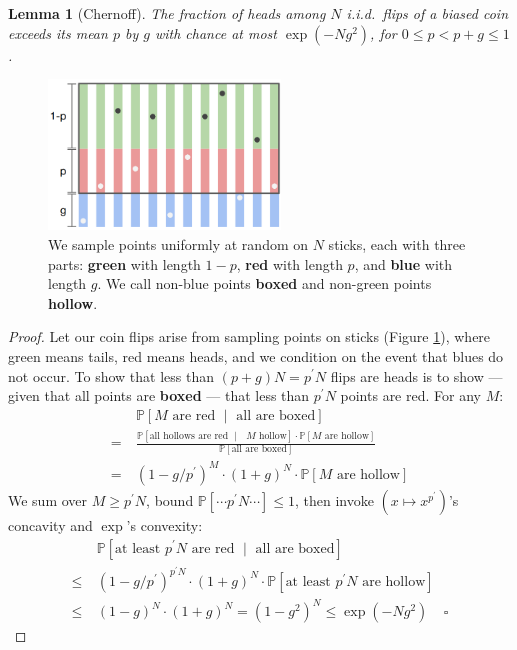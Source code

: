 \documentclass[11pt, justified]{tufte-book}
\newcommand{\Pp}{\mathbb{P}}\newcommand{\pP}{\mathcal{P}}
\newtheorem*{lem}{Lemma}
\theoremstyle{definition}
\begin{document}
        \begin{lem}[Chernoff]
            The fraction of heads among $N$ i.i.d.\ flips of a biased coin
            exceeds its mean $p$ by $g$ with chance at most 
            $\exp(-Ng^2)$, for $0 \leq p < p+g \leq 1$.
        \end{lem}
        \begin{figure}[h]
            \centering
            \includegraphics[height=4cm, clip]{chernoff}
            \caption{{
                We sample points uniformly at random on $N$
                sticks, each with three parts: \textbf{green}
                with length $1-p$, \textbf{red} with length $p$, and
                \textbf{blue} with length $g$.  We call non-blue points
                \textbf{boxed} and non-green points \textbf{hollow}.
            }}
            \label{fig:chernoff}
        \end{figure}
        \begin{proof} \renewcommand{\qedsymbol}{}
            Let our coin flips arise from sampling points on sticks
            (Figure \ref{fig:chernoff}), where green means tails, red
            means heads, and we condition on the event that blues do not occur.
            To show that less than $(p+g)N = p^\prime N$ flips are
            heads is to show --- given that all points are \textbf{boxed} ---
            that less than $p^\prime N$ points are red. 
            For any $M$:
            {%
            \begin{align*}
                    & ~ \Pp[\text{$M$ are red $\mid$ all are boxed}] \\
                  = & ~ \frac{\Pp[\text{all hollows are red $\mid$ $M$ hollow}] \cdot \Pp[\text{$M$ are hollow}]}{\Pp[\text{all are boxed}] } \\
                  = & ~ (1 - g/p^\prime)^{M} \cdot (1+g)^{N} \cdot \Pp[\text{$M$ are hollow}]
            \end{align*}
            }%
            We sum over $M\geq p^\prime N$, bound $\Pp[\cdots p^\prime N \cdots] \leq 1$,
            then invoke $(x \mapsto x^{p^\prime})$'s concavity and
            $\exp$'s convexity:
            \begin{align*}
                &~\Pp[\text{at least $p^\prime N$ are red $\mid$ all are boxed}]
                \\ \leq
                &~(1 - g/p^\prime)^{p^\prime N} \cdot (1+g)^{N} \cdot \Pp[\text{at least $p^\prime N$ are hollow}]
                \\ \leq
                &~(1 - g)^N \cdot (1 + g)^{N}
                =
                (1 - g^2)^N
                \leq
                \exp(- Ng^2)
                ~~~~~\square
            \end{align*}
        \end{proof}
\end{document}
